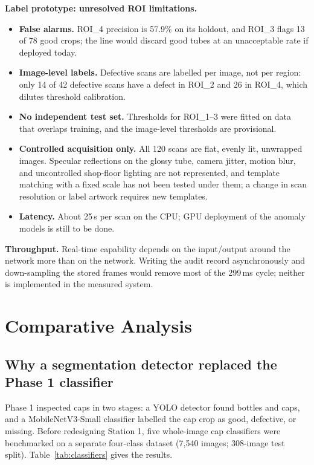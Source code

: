 \noindent\textbf{Label prototype: unresolved ROI limitations.}
\begin{itemize}
    \item \textbf{False alarms.} ROI\_4 precision is 57.9\% on its holdout, and ROI\_3 flags 13 of 78 good crops; the line would discard good tubes at an unacceptable rate if deployed today.
    \item \textbf{Image-level labels.} Defective scans are labelled per image, not per region: only 14 of 42 defective scans have a defect in ROI\_2 and 26 in ROI\_4, which dilutes threshold calibration.
    \item \textbf{No independent test set.} Thresholds for ROI\_1--3 were fitted on data that overlaps training, and the image-level thresholds are provisional.
    \item \textbf{Controlled acquisition only.} All 120 scans are flat, evenly lit, unwrapped images. Specular reflections on the glossy tube, camera jitter, motion blur, and uncontrolled shop-floor lighting are not represented, and template matching with a fixed scale has not been tested under them; a change in scan resolution or label artwork requires new templates.
    \item \textbf{Latency.} About 25\,s per scan on the CPU; GPU deployment of the anomaly models is still to be done.
\end{itemize}

\noindent\textbf{Throughput.} Real-time capability depends on the input/output around the network more than on the network. Writing the audit record asynchronously and down-sampling the stored frames would remove most of the 299\,ms cycle; neither is implemented in the measured system.

\section{Comparative Analysis}
\label{sec:comparative-analysis}

\subsection{Why a segmentation detector replaced the Phase 1 classifier}
\label{sec:why-seg}
Phase 1 inspected caps in two stages: a YOLO detector found bottles and caps, and a MobileNetV3-Small classifier labelled the cap crop as good, defective, or missing. Before redesigning Station 1, five whole-image cap classifiers were benchmarked on a separate four-class dataset (7,540 images; 308-image test split). Table~\ref{tab:classifiers} gives the results.

